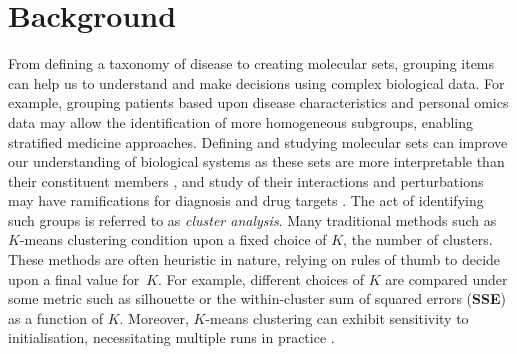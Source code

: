 \documentclass{bmcart}
\begin{document}
\section*{Background}

From defining a taxonomy of disease to creating molecular sets, grouping items can help us to understand and make decisions using complex biological data. For example, grouping patients based upon disease characteristics and personal omics data may allow the identification of more homogeneous subgroups, enabling stratified medicine approaches. Defining and studying molecular sets can improve our understanding of biological systems as these sets are more interpretable than their constituent members \citep{hejblum2015time}, and study of their interactions and perturbations may have ramifications for diagnosis and drug targets \citep{bai2013strategic, emmert2014gene}. 
The act of identifying such groups is referred to as {\em cluster analysis}. Many traditional methods such as $K$-means clustering \citep{lloyd1982least, forgy1965cluster} condition upon a fixed choice of $K$, the number of clusters.  These methods are often heuristic in nature, relying on rules of thumb to decide upon a final value for~$K$. For example, different choices of $K$ are compared under some metric such as silhouette \citep{RousseeuwSilhouettesgraphicalaid1987} or the within-cluster sum of squared errors (\textbf{SSE}) as a function of $K$. Moreover, $K$-means clustering can exhibit sensitivity to initialisation, necessitating multiple runs in practice \citep{arthur2006k}. %
\end{document}
